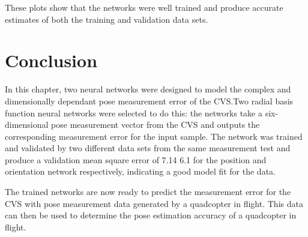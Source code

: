 These plots show that the networks were well trained and produce accurate estimates of both the training and validation data sets. 
\section{Conclusion}

In this chapter, two neural networks were designed to model the complex and dimensionally dependant pose measurement error of the CVS.\@ Two radial basis function neural networks were selected to do this: the networks take a six-dimensional pose measurement vector from the CVS and outputs the corresponding measurement error for the input sample. The network was trained and validated by two different data sets from the same measurement test and produce a validation mean square error of 7.14 6.1 for the position and orientation network respectively, indicating a good model fit for the data. 

The trained networks are now ready to predict the measurement error for the CVS with pose measurement data generated by a quadcopter in flight. This data can then be used to determine the pose estimation accuracy of a quadcopter in flight. 
